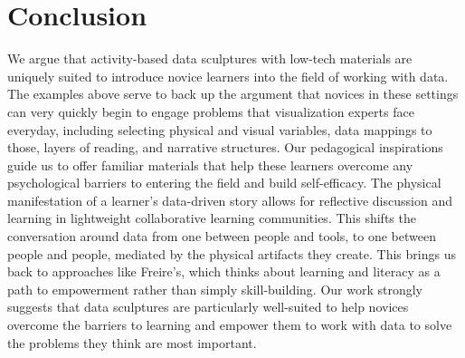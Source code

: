 \documentclass{sigchi-ext}
\begin{document}
\section{Conclusion}

We argue that activity-based data sculptures with low-tech materials are uniquely suited to introduce novice learners into the field of working with data.  The examples above serve to back up the argument that novices in these settings can very quickly begin to engage problems that visualization experts face everyday, including selecting physical and visual variables, data mappings to those, layers of reading, and narrative structures.  Our pedagogical inspirations guide us to offer familiar materials that help these learners overcome any psychological barriers to entering the field and build self-efficacy.  The physical manifestation of a learner's data-driven story allows for reflective discussion and learning in lightweight collaborative learning communities.  This shifts the conversation around data from one between people and tools, to one between people and people, mediated by the physical artifacts they create.  This brings us back to approaches like Freire's, which thinks about learning and literacy as a path to empowerment rather than simply skill-building.  Our work strongly suggests that data sculptures are particularly well-suited to help novices overcome the barriers to learning and empower them to work with data to solve the problems they think are most important.

\balance{} 



\end{document}
